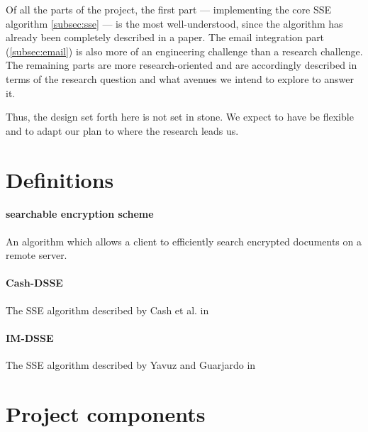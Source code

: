 
Of all the parts of the project, the first part --- implementing the core SSE algorithm \ref{subsec:sse} --- is the most well-understood, since the algorithm has already been completely described in a paper.
The email integration part (\ref{subsec:email}) is also more of an engineering challenge than a research challenge. 
The remaining parts are more research-oriented and are accordingly described in terms of the research question and what avenues we intend to explore to answer it.

Thus, the design set forth here is not set in stone.
We expect to have be flexible and to adapt our plan to where the research leads us. 



\section{ Definitions }

\paragraph*{\textbf{searchable encryption scheme}} An algorithm which allows a client to efficiently search encrypted documents on a remote server.

\paragraph*{\textbf{Cash-DSSE}} The SSE algorithm described by Cash et al. in \cite{cash14}

\paragraph*{\textbf{IM-DSSE}} The SSE algorithm described by Yavuz and Guarjardo in \cite{yavuz15}




\section{ Project components }





